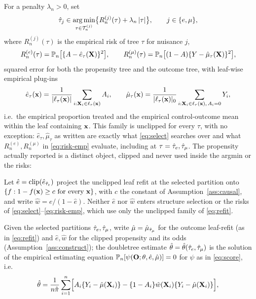\documentclass[12pt]{article}
\begin{document}
For a penalty $\lambda_n>0$, set
\begin{equation}\label{eq:select}
  \hat{\tau}_j\in\operatorname*{arg\,min}_{\tau\in\mathcal{T}^{(j)}_n}
  \bigl\{R^{(j)}_n(\tau)+\lambda_n\left|\tau\right|\bigr\},
  \qquad j\in\{e,\mu\},
\end{equation}
where $R^{(j)}_n(\tau)$ is the empirical risk of tree $\tau$ for nuisance $j$,
\begin{equation}\label{eq:risk-emp}
R^{(e)}_n(\tau)=\mathbb{P}_n\bigl[\{A-\hat e_\tau(\mathbf{X})\}^2\bigr],
\qquad
R^{(\mu)}_n(\tau)=\mathbb{P}_n\bigl[(1-A)\{Y-\hat\mu_\tau(\mathbf{X})\}^2\bigr],
\end{equation}
squared error for both the propensity tree and the outcome tree, with leaf-wise empirical plug-ins
\begin{equation}\label{eq:refit}
\hat e_\tau(\mathbf{x})=\frac{1}{|\ell_\tau(\mathbf{x})|}\sum_{i:\mathbf{X}_i\in\ell_\tau(\mathbf{x})}A_i,
\qquad
\hat\mu_\tau(\mathbf{x})=\frac{1}{|\ell_\tau(\mathbf{x})|_0}\sum_{i:\mathbf{X}_i\in\ell_\tau(\mathbf{x}),\,A_i=0}Y_i ,
\end{equation}
i.e.\ the empirical proportion treated and the empirical control-outcome mean within the leaf containing $\mathbf{x}$. This family is unclipped for every $\tau$, with no exception: $\hat e_\tau,\hat\mu_\tau$ as written are exactly what \eqref{eq:select} searches over and what $R^{(e)}_n,R^{(\mu)}_n$ in \eqref{eq:risk-emp} evaluate, including at $\tau=\hat{\tau}_e,\hat{\tau}_\mu$. The propensity actually reported is a distinct object, clipped and never used inside the argmin or the risks:
\begin{assumption}[Clipping]\label{ass:construct}
Let $\hat e=\mathrm{clip}(\hat e_{\hat{\tau}_e})$ project the unclipped leaf refit at the selected partition onto $\{f:1-f(\mathbf{x})\ge c\text{ for every }\mathbf{x}\}$, with $c$ the constant of Assumption~\ref{ass:causal}, and write $\hat w=\hat e/(1-\hat e)$. Neither $\hat e$ nor $\hat w$ enters structure selection or the risks of \eqref{eq:select}--\eqref{eq:risk-emp}, which use only the unclipped family of \eqref{eq:refit}.
\end{assumption}
Given the selected partitions $\hat{\tau}_e,\hat{\tau}_\mu$, write $\hat\mu=\hat\mu_{\hat{\tau}_\mu}$ for the outcome leaf-refit (as in \eqref{eq:refit}) and $\hat e,\hat w$ for the clipped propensity and its odds (Assumption~\ref{ass:construct}); the doubletree estimate $\hat{\theta}=\hat{\theta}(\hat{\tau}_e,\hat{\tau}_\mu)$ is the solution of the empirical estimating equation $\mathbb{P}_n[\psi(\mathbf{O};\theta,\hat e,\hat\mu)]=0$ for $\psi$ as in \eqref{eq:score}, i.e.\
\[
  \hat{\theta}
  =
  \frac{1}{n\hat\pi}\sum_{i=1}^n
  \Bigl[A_i\{Y_i-\hat\mu(\mathbf{X}_i)\}
    -\{1-A_i\}\hat w(\mathbf{X}_i)\{Y_i-\hat\mu(\mathbf{X}_i)\}\Bigr],
\]
\end{document}
